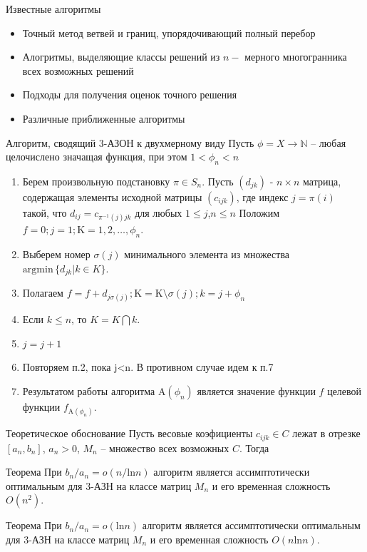\documentclass[12pt]{beamer}
\begin{document}
\begin{frame}{Известные  алгоритмы}
\begin{itemize}
\item Точный метод ветвей и границ, упорядочивающий полный перебор
\item Алогритмы, выделяющие классы решений из $n-$ мерного многогранника всех возможных решений
\item Подходы для получения оценок точного решения
\item Различные приближенные алгоритмы
\end{itemize}

\end{frame}

\begin{frame}{Алгоритм, сводящий 3-АЗОН к двухмерному виду}
Пусть $\phi = X \rightarrow \mathbb{N}$ -- любая целочислено значащая функция, при этом $1 < \phi_n < n$ 
\begin{enumerate}
\item Берем произвольную подстановку $\pi \in S_n$. Пусть $(d_{jk})$ - $n \times n$ 
матрица, содержащая элементы исходной матрицы $(c_{ijk})$, где индекс $j=\pi(i)$ такой, что
$
d_{ij} = c_{\pi^{-1}(j)jk}
$
для любых $1 \leq j$,$n \leq n$
Положим $f = 0 ; j =1 ; \mathrm{K}={1,2, \ldots , \phi_n}$. 
\item Выберем номер $\sigma(j)$ минимального элемента из множества $\mathrm{argmin} \, \{d_{jk} | k \in K \}$.
\item Полагаем $f = f + d_{j \sigma (j)} ; \mathrm{K} = \mathrm{K}  \setminus  {\sigma(j)} ; k=j+\phi_n$
\item Если $k \leq n $, то $K = K \bigcap {k}$.
\item $j = j + 1$
\item Повторяем п.2, пока j<n. В противном случае идем к п.7
\item Результатом работы алгоритма $\mathrm{A}(\phi_n)$ является значение функции $f$ целевой функции   
$f_{\mathrm{A}(\phi_n)}$. 
\end{enumerate}
\end{frame}

\begin{frame}{Теоретическое обоснование}
Пусть весовые коэфициенты $c_{ijk} \in C$ лежат в отрезке $[a_n, b_n]$, $a_n>0$, $M_n$ -- множество всех возможных $C$. Тогда
\begin{block}{Теорема}
При $b_n / a_n = o(n/ \mathrm{ln} n)$ алгоритм является ассимптотически оптимальным для 3-АЗН на классе матриц $M_n$
и его временная сложность  $O(n^2)$.
\end{block}
\begin{block}{Теорема}
При $b_n / a_n = o(\mathrm{ln} n)$ алгоритм является ассимптотически оптимальным для 3-АЗН на классе матриц $M_n$
и его временная сложность  $O(n \mathrm{ln} n)$. 
\end{block}
\end{frame}
\end{document}

